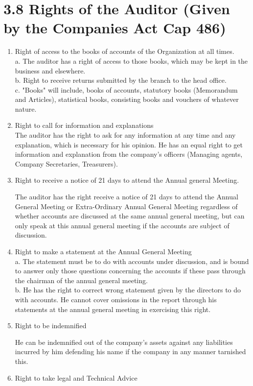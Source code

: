 \documentclass[10pt]{article}
\begin{document}
\section*{3.8 Rights of the Auditor (Given by the Companies Act Cap 486)}
\begin{enumerate}
  \item Right of access to the books of accounts of the Organization at all times.\\
a. The auditor has a right of access to those books, which may be kept in the business and elsewhere.\\
b. Right to receive returns submitted by the branch to the head office.\\
c. "Books" will include, books of accounts, statutory books (Memorandum and Articles), statistical books, consisting books and vouchers of whatever nature.
  \item Right to call for information and explanations\\
  The auditor has the right to ask for any information at any time and any explanation, which is necessary for his opinion. He has an equal right to get information and explanation from the company's officers (Managing agents, Company Secretaries, Treasurers).\\
  \item Right to receive a notice of 21 days to attend the Annual general Meeting.
  
  The auditor has the right receive a notice of 21 days to attend the Annual General Meeting or Extra-Ordinary Annual General Meeting regardless of whether accounts are discussed at the same annual general meeting, but can only speak at this annual general meeting if the accounts are subject of discussion.\\
  \item Right to make a statement at the Annual General Meeting\\
  a. The statement must be to do with accounts under discussion, and is bound to answer only those questions concerning the accounts if these pass through the chairman of the annual general meeting.\\
  b. He has the right to correct wrong statement given by the directors to do with accounts. He cannot cover omissions in the report through his statements at the annual general meeting in exercising this right.\\
  \item Right to be indemnified
  
  He can be indemnified out of the company's assets against any liabilities incurred by him defending his name if the company in any manner tarnished this.\\
  \item Right to take legal and Technical Advice
  

\end{enumerate}
\end{document}
